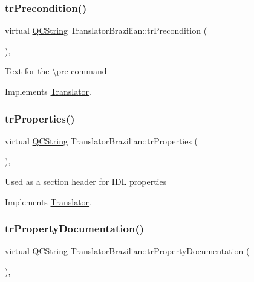 \subsubsection{\texorpdfstring{trPrecondition()}{trPrecondition()}}
{\footnotesize\ttfamily virtual \mbox{\hyperlink{class_q_c_string}{Q\+C\+String}} Translator\+Brazilian\+::tr\+Precondition (\begin{DoxyParamCaption}{ }\end{DoxyParamCaption})\hspace{0.3cm}{\ttfamily [inline]}, {\ttfamily [virtual]}}

Text for the \textbackslash{}pre command 

Implements \mbox{\hyperlink{class_translator}{Translator}}.

\mbox{\label{class_translator_brazilian_aadad375f0a8ae71538e76e379b664413}} 
\subsubsection{\texorpdfstring{trProperties()}{trProperties()}}
{\footnotesize\ttfamily virtual \mbox{\hyperlink{class_q_c_string}{Q\+C\+String}} Translator\+Brazilian\+::tr\+Properties (\begin{DoxyParamCaption}{ }\end{DoxyParamCaption})\hspace{0.3cm}{\ttfamily [inline]}, {\ttfamily [virtual]}}

Used as a section header for I\+DL properties 

Implements \mbox{\hyperlink{class_translator}{Translator}}.

\mbox{\label{class_translator_brazilian_a210940bb0c44114f670caca208c764b3}} 
\subsubsection{\texorpdfstring{trPropertyDocumentation()}{trPropertyDocumentation()}}
{\footnotesize\ttfamily virtual \mbox{\hyperlink{class_q_c_string}{Q\+C\+String}} Translator\+Brazilian\+::tr\+Property\+Documentation (\begin{DoxyParamCaption}{ }\end{DoxyParamCaption})\hspace{0.3cm}{\ttfamily [inline]}, {\ttfamily [virtual]}}

